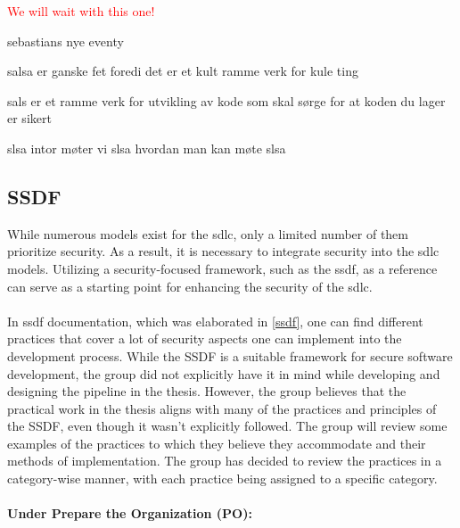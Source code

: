 \textcolor{red}{We will wait with this one!}

sebastians nye eventy

salsa er ganske fet foredi det er et kult ramme verk for kule ting 

sals er et ramme verk for utvikling av kode som skal sørge for at koden du lager er sikert 

slsa intor
møter vi slsa 
hvordan man kan møte slsa 


\subsection{SSDF}
While numerous models exist for the \acrlong{sdlc}, only a limited number of them prioritize security. As a result, it is necessary to integrate security into the \acrshort{sdlc} models. Utilizing a security-focused framework, such as the \acrshort{ssdf}, as a reference can serve as a starting point for enhancing the security of the \acrshort{sdlc}. 
\\~\\
In \acrshort{ssdf} documentation, which was elaborated in \ref{ssdf}, one can find different practices that cover a lot of security aspects one can implement into the development process. While the SSDF is a suitable framework for secure software development, the group did not explicitly have it in mind while developing and designing the pipeline in the thesis. However, the group believes that the practical work in the thesis aligns with many of the practices and principles of the SSDF, even though it wasn't explicitly followed. The group will review some examples of the practices to which they believe they accommodate and their methods of implementation. The group has decided to review the practices in a category-wise manner, with each practice being assigned to a specific category. 
\\~\\
\textbf{Under Prepare the Organization (PO):}

